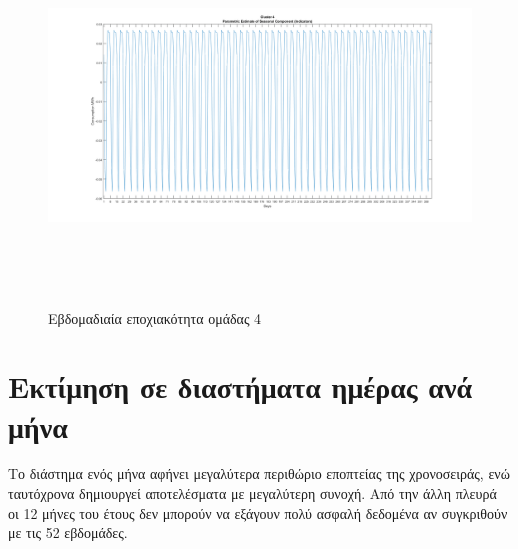 \documentclass[a4paper, 11pt]{article}
\begin{document}
\begin{figure}[ht!]
\centering
\includegraphics[width=180mm, height=100mm]{../../plots/Trend_estimation/seasonal_4.png}
\caption{Εβδομαδιαία εποχιακότητα ομάδας 4\label{seas4}}
\end{figure}

\section*{Εκτίμηση σε διαστήματα ημέρας ανά μήνα}
Το διάστημα ενός μήνα αφήνει μεγαλύτερα περιθώριο εποπτείας της χρονοσειράς, ενώ ταυτόχρονα δημιουργεί αποτελέσματα με μεγαλύτερη συνοχή. Από την άλλη πλευρά οι 12 μήνες του έτους δεν μπορούν να εξάγουν πολύ ασφαλή δεδομένα αν συγκριθούν με τις 52 εβδομάδες.
\end{document}
